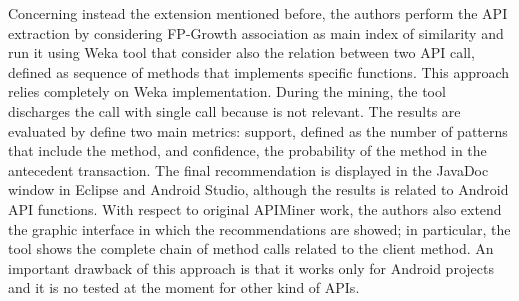 Concerning instead the extension mentioned before, the authors perform the API extraction by considering FP-Growth association as main index of similarity and run it using Weka tool that consider also the relation between two API call, defined as sequence of methods that implements specific functions. This approach relies completely on Weka implementation. During the mining, the tool discharges the call with single call because is not relevant. The results are evaluated by define two main metrics: support, defined as the number of patterns that include the method, and confidence, the probability of the method in the antecedent transaction. The final recommendation is displayed in the JavaDoc window in Eclipse and Android Studio, although the results is related to Android API functions. With respect to original APIMiner work, the authors also extend the graphic interface in which the recommendations are showed; in particular, the tool shows the complete chain of method calls related to the client method. An important drawback of this approach is that it works only for Android projects and it is no tested at the moment for other kind of APIs.

